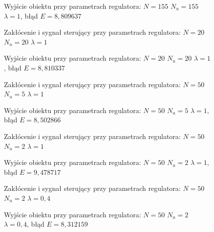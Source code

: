 \begin{figure}[H]
\centering

\caption{Wyjście obiektu przy parametrach regulatora: $N=155$ $N_u=155$ $\lambda=1$, błąd $E=8,809637$}
\end{figure}


\begin{figure}[H]
\centering

\caption{Zakłócenie i sygnał sterujący przy parametrach regulatora: $N=20$ $N_u=20$ $\lambda=1$}
\end{figure}

\begin{figure}[H]
\centering

\caption{Wyjście obiektu przy parametrach regulatora: $N=20$ $N_u=20$ $\lambda=1$, błąd $E=8,810337$}
\end{figure}

\begin{figure}[H]
\centering

\caption{Zakłócenie i sygnał sterujący przy parametrach regulatora: $N=50$ $N_u=5$ $\lambda=1$}
\end{figure}

\begin{figure}[H]
\centering

\caption{Wyjście obiektu przy parametrach regulatora: $N=50$ $N_u=5$ $\lambda=1$, błąd $E=8,502866$}
\end{figure}


\begin{figure}[H]
\centering

\caption{Zakłócenie i sygnał sterujący przy parametrach regulatora: $N=50$ $N_u=2$ $\lambda=1$}
\end{figure}

\begin{figure}[H]
\centering

\caption{Wyjście obiektu przy parametrach regulatora: $N=50$ $N_u=2$ $\lambda=1$, błąd $E=9,478717$}
\end{figure}


\begin{figure}[H]
\centering

\caption{Zakłócenie i sygnał sterujący przy parametrach regulatora: $N=50$ $N_u=2$ $\lambda=0,4$}
\end{figure}

\begin{figure}[H]
\centering

\caption{Wyjście obiektu przy parametrach regulatora: $N=50$ $N_u=2$ $\lambda=0,4$, błąd $E=8,312159$}
\end{figure}

